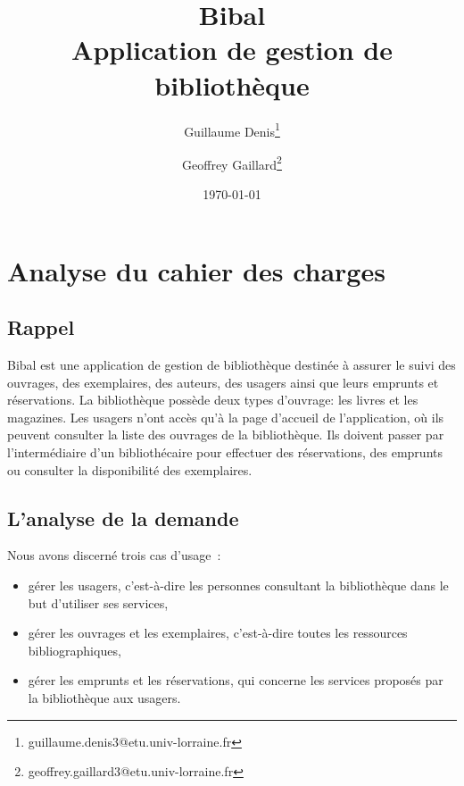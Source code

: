 \documentclass[a4paper,12pt]{article}
\author[]{Guillaume Denis\thanks{guillaume.denis3@etu.univ-lorraine.fr}}
\author[]{Geoffrey Gaillard\thanks{geoffrey.gaillard3@etu.univ-lorraine.fr}}
\affil{Université de Lorraine, UFR Mathématiques et Informatique}
\date{\today}
\title{Bibal \\ \small{Application de gestion de bibliothèque}}
\begin{document}
\vfill

\maketitle

\thispagestyle{empty}

\clearpage


\thispagestyle{empty}

\tableofcontents

\clearpage



\section{Analyse du cahier des charges}
\label{sec:orgheadline3}

\subsection{Rappel}
\label{sec:orgheadline1}

Bibal est une application de gestion de bibliothèque destinée à assurer le suivi
des ouvrages, des exemplaires, des auteurs, des usagers ainsi que leurs emprunts
et réservations. La bibliothèque possède deux types d’ouvrage: les livres et les
magazines. Les usagers n’ont accès qu'à la page d’accueil de l’application, où
ils peuvent consulter la liste des ouvrages de la bibliothèque. Ils doivent
passer par l’intermédiaire d’un bibliothécaire pour effectuer des réservations,
des emprunts ou consulter la disponibilité des exemplaires.

\subsection{L’analyse de la demande}
\label{sec:orgheadline2}



Nous avons discerné trois cas d’usage :
\begin{itemize}
\item gérer les usagers, c'est-à-dire les personnes consultant la bibliothèque dans le but d’utiliser ses services,
\item gérer les ouvrages et les exemplaires, c'est-à-dire toutes les ressources bibliographiques,
\item gérer les emprunts et les réservations, qui concerne les services proposés par la bibliothèque aux usagers.
\end{itemize}
\end{document}

